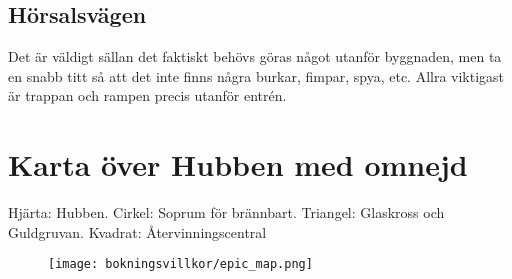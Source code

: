 \subsection{Hörsalsvägen}
Det är väldigt sällan det faktiskt behövs göras något utanför byggnaden, men ta en snabb titt så att det inte finns några burkar, fimpar, spya, etc. Allra viktigast är trappan och rampen precis utanför entrén.

\newpage
\section{Karta över Hubben med omnejd}
Hjärta: Hubben. Cirkel: Soprum för brännbart. Triangel: Glaskross och Guldgruvan. Kvadrat: Återvinningscentral
\begin{figure}[h]
    \centering
    \texttt{[image: bokningsvillkor/epic\_map.png]}
    \label{fig:map}
\end{figure}
